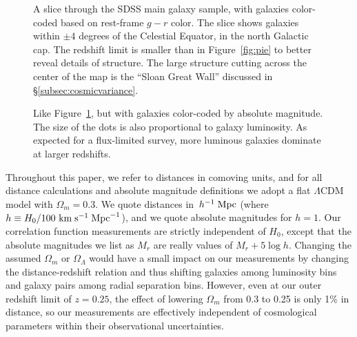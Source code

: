 \documentclass[]{emulateapj}
\newcommand{\kms}{\,{\rm km}\;{\rm s}^{-1}}
\newcommand{\hubunits}{\,\kms\;{\rm Mpc}^{-1}}
\newcommand{\hmpc}{\,h^{-1}\;{\rm Mpc}}
\begin{document}
\begin{figure*}[tbp]%
\caption[]{\label{fig:pie_color}
A slice through the SDSS main galaxy sample, with galaxies color-coded
based on rest-frame $g-r$ color.  The slice shows galaxies within
$\pm 4$ degrees of the Celestial Equator, in the north Galactic cap.
The redshift limit is smaller than in Figure~\ref{fig:pie}
to better reveal details of structure.
The large structure cutting across the center of the map is the
``Sloan Great Wall'' \citep{gott05} discussed in \S\ref{subsec:cosmicvariance}.
}
\end{figure*}

\begin{figure*}[bp]%
\caption[]{\label{fig:pie_lum}
Like Figure~\ref{fig:pie_color}, but with galaxies color-coded by absolute 
magnitude.  The size of the dots is also proportional to galaxy luminosity.
As expected for a flux-limited survey, more luminous galaxies 
dominate at larger redshifts.
}
\end{figure*}


Throughout this paper, we refer to distances in
comoving units, and for all distance calculations and absolute 
magnitude definitions we adopt a flat $\Lambda$CDM model with $\Omega_m=0.3$.
We quote distances in $\hmpc$ (where $h\equiv H_0/100\hubunits$), and 
we quote absolute magnitudes for $h=1$.
Our correlation function 
measurements are strictly independent of $H_0$, except that the
absolute magnitudes we list as $M_r$ are really values of $M_r+5\log h$.
Changing the assumed $\Omega_m$ or $\Omega_\Lambda$ would
have a small impact on our measurements by changing the distance-redshift
relation and thus shifting galaxies among luminosity bins and galaxy pairs
among radial separation bins.  However, even at our outer redshift limit
of $z=0.25$, the effect of lowering $\Omega_m$ from 0.3 to 0.25 is only 1\%
in distance, so our measurements are effectively independent of
cosmological parameters within their observational uncertainties.
\end{document}
